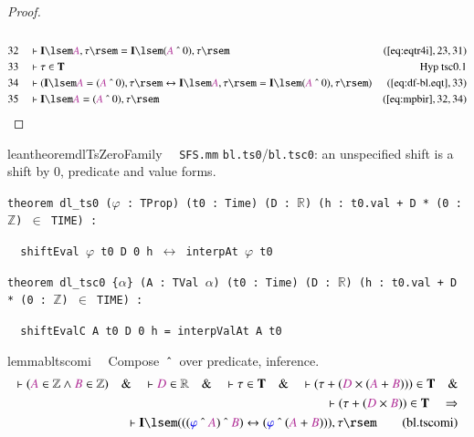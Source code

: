 \begin{proof}
\begin{align}
  \\ 32 &&  & \vdash \mathbf{I} \lsem \mc{A} , \tau \rsem = \mathbf{I} \lsem (
      \mc{A} ~\string^~ 0 ) , \tau
      \rsem&(\mbox{\ref{eq:eqtr4i}},23,31)\notag
  \\ 33 &&  & \vdash \tau \in \mathbf{T}&\text{Hyp~tsc0.1}\notag%
  \\ 34 &&  & \vdash ( \mathbf{I} \lsem \mc{A} = ( \mc{A} ~\string^~ 0 ) , \tau
      \rsem \leftrightarrow \mathbf{I} \lsem \mc{A} , \tau
      \rsem = \mathbf{I} \lsem ( \mc{A} ~\string^~ 0 ) ,
      \tau \rsem )&(\mbox{\ref{eq:df-bl.eqt}},33)\notag
  \\ 35 &&  & \vdash \mathbf{I} \lsem \mc{A} = ( \mc{A} ~\string^~ 0 ) , \tau
      \rsem&(\mbox{\ref{eq:mpbir}},32,34)\notag
\end{align}
\end{proof}

\begin{restatable}{leantheorem}{dlTsZeroFamily}~~ \texttt{SFS.mm} \texttt{bl.ts0}/\texttt{bl.tsc0}: an unspecified shift is a shift by $0$, predicate and value forms.

\texttt{\textcolor{leancolor}{theorem} \textcolor{leanyellow}{dl\_ts0} ($\varphi$ : TProp) (t0 : Time) (D : $\mathbb{R}$) (h : t0.val + D * (0 : $\mathbb{Z}$) $\in$ TIME) :}

\texttt{~~shiftEval $\varphi$ t0 D 0 h $\leftrightarrow$ interpAt $\varphi$ t0}

\texttt{\textcolor{leancolor}{theorem} \textcolor{leanyellow}{dl\_tsc0} \{$\alpha$\} (A : TVal $\alpha$) (t0 : Time) (D : $\mathbb{R}$) (h : t0.val + D * (0 : $\mathbb{Z}$) $\in$ TIME) :}

\texttt{~~shiftEvalC A t0 D 0 h = interpValAt A t0}
\label{dl_ts0}
\label{dl_tsc0}
\end{restatable}

\begin{restatable}{lemma}{bltscomi}~~ Compose $~\string^~$  over predicate,
inference.
\begin{align}
\vdash ( \mc{A} \in \mathbb{Z} \wedge \mc{B} \in \mathbb{Z} )\quad\&\quad
    \vdash \mc{D} \in \mathbb{R}\quad\&\quad \vdash \tau \in
    \mathbf{T}\quad\&\quad \vdash ( \tau + ( \mc{D} \times ( \mc{A} + \mc{B} ) )
    ) \in \mathbf{T}\quad\& \notag \\ %
      \quad \vdash ( \tau + ( \mc{D} \times \mc{B} ) ) \in
    \mathbf{T}\quad\Rightarrow \notag \\ %
      \quad \vdash \mathbf{I} \lsem ( ( ( \mw{\varphi}
    ~\string^~ \mc{A} ) ~\string^~ \mc{B} ) \leftrightarrow ( \mw{\varphi}
    ~\string^~ ( \mc{A} + \mc{B} ) ) ) , \tau
    \rsem\label{eq:bl.tscomi}\tag{bl.tscomi}
\end{align}
\end{restatable}

